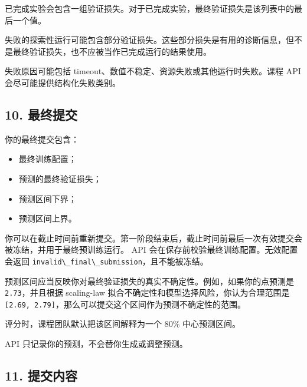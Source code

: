 \documentclass[
  11pt,
]{ctexart}
\newcommand{\passthrough}[1]{#1}
\providecommand{\tightlist}{%
  \setlength{\itemsep}{0pt}\setlength{\parskip}{0pt}}
\begin{document}
已完成实验会包含一组验证损失。对于已完成实验，最终验证损失是该列表中的最后一个值。

失败的探索性运行可能包含部分验证损失。这些部分损失是有用的诊断信息，但不是最终验证损失，也不应被当作已完成运行的结果使用。

失败原因可能包括 timeout、数值不稳定、资源失败或其他运行时失败。课程 API
会尽可能提供结构化失败类别。

\hypertarget{ux6700ux7ec8ux63d0ux4ea4}{%
\subsection{10. 最终提交}\label{ux6700ux7ec8ux63d0ux4ea4}}

你的最终提交包含：

\begin{itemize}
\tightlist
\item
  最终训练配置；
\item
  预测的最终验证损失；
\item
  预测区间下界；
\item
  预测区间上界。
\end{itemize}

你可以在截止时间前重新提交。第一阶段结束后，截止时间前最后一次有效提交会被冻结，并用于最终预训练运行。
API 会在保存前校验最终训练配置。无效配置会返回
\passthrough{\lstinline!invalid\_final\_submission!}，且不能被冻结。

预测区间应当反映你对最终验证损失的真实不确定性。例如，如果你的点预测是
\passthrough{\lstinline!2.73!}，并且根据 scaling-law
拟合不确定性和模型选择风险，你认为合理范围是
\passthrough{\lstinline![2.69, 2.79]!}，那么可以提交这个区间作为预测不确定性的范围。

评分时，课程团队默认把该区间解释为一个 80\% 中心预测区间。

API 只记录你的预测，不会替你生成或调整预测。

\hypertarget{ux63d0ux4ea4ux5185ux5bb9}{%
\subsection{11. 提交内容}\label{ux63d0ux4ea4ux5185ux5bb9}}
\end{document}
